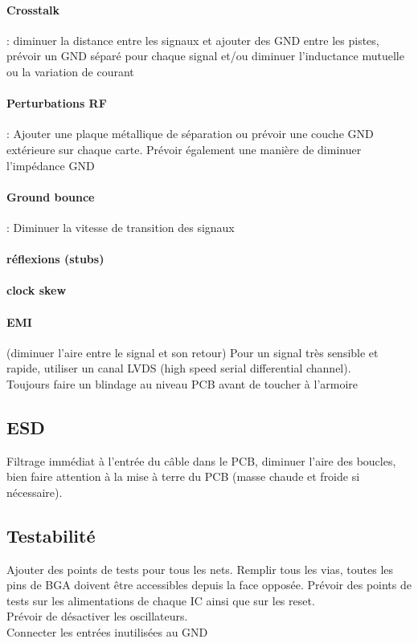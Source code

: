 \documentclass[resume]{subfiles}
\begin{document}
\begin{multicols}{3}
\paragraph{Crosstalk} : diminuer la distance entre les signaux et ajouter des GND entre les pistes, prévoir un GND séparé pour chaque signal et/ou diminuer l'inductance mutuelle ou la variation de courant
\paragraph{Perturbations RF} : Ajouter une plaque métallique de séparation ou prévoir une couche GND extérieure sur chaque carte. Prévoir également une manière de diminuer l'impédance GND
\paragraph{Ground bounce} : Diminuer la vitesse de transition des signaux
\paragraph{réflexions (stubs)}
\paragraph{clock skew}
\paragraph{EMI} (diminuer l'aire entre le signal et son retour)
Pour un signal très sensible et rapide, utiliser un canal LVDS (high speed serial differential channel).\\
Toujours faire un blindage au niveau PCB avant de toucher à l'armoire
\subsection{ESD}
Filtrage immédiat à l'entrée du câble dans le PCB, diminuer l'aire des boucles, bien faire attention à la mise à terre du PCB (masse chaude et froide si nécessaire).
\subsection{Testabilité}
Ajouter des points de tests pour tous les nets. Remplir tous les vias, toutes les pins de BGA doivent être accessibles depuis la face opposée. Prévoir des points de tests sur les alimentations de chaque IC ainsi que sur les reset.\\
Prévoir de désactiver les oscillateurs.\\
Connecter les entrées inutilisées au GND

\end{multicols}
\end{document}
